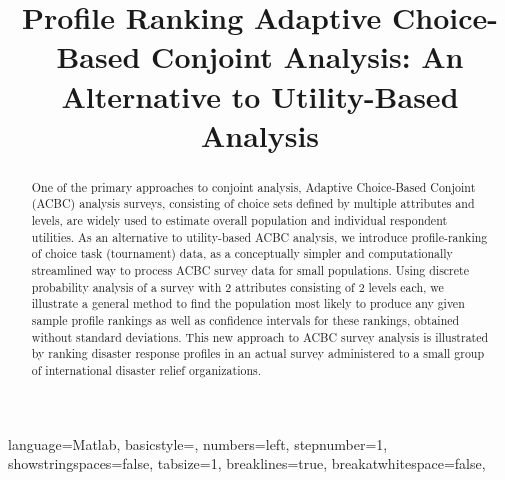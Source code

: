 \documentclass[a4paper, 12pt]{article}
\title {Profile Ranking Adaptive Choice-Based Conjoint Analysis: An Alternative to Utility-Based Analysis}
\author[1]{}
\date{}
\begin{document}
\lstset
{ %
    language=Matlab,
    basicstyle=\scriptsize,
    numbers=left,
    stepnumber=1,
    showstringspaces=false,
    tabsize=1,
    breaklines=true,
    breakatwhitespace=false,
}
\maketitle
\hrulefill



 \vspace{.7in}
 
\begin{abstract}
One of the primary approaches to conjoint analysis, Adaptive Choice-Based Conjoint (ACBC) analysis surveys, consisting of choice sets defined by multiple attributes and levels, are widely used to estimate overall population and individual respondent utilities. As an alternative to utility-based ACBC analysis, we introduce profile-ranking of choice task (tournament) data, as a conceptually simpler and computationally streamlined way to process ACBC survey data for small populations. Using discrete probability analysis of a survey with 2 attributes consisting of 2 levels each, we illustrate  a general method to find the population  most likely to produce any given sample profile rankings as well as  confidence intervals for these rankings, obtained without standard deviations.  This new approach to ACBC survey analysis is illustrated by ranking disaster response profiles in an actual survey administered to a small group of international disaster relief organizations.


\end{abstract}


 
\end{document}
